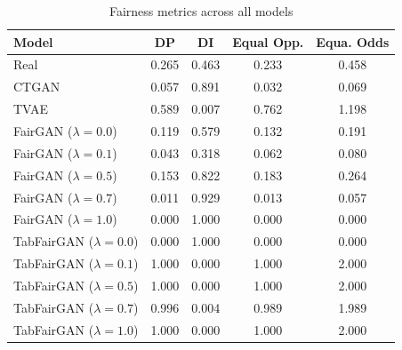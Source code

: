 \begin{table}[h!]
\label{tab:results-fairness}
\centering
\begin{tabular}{lcccc}
\toprule
Model & DP & DI & Equal Opp. & Equa. Odds \\
\midrule
Real & 0.265 & 0.463 & 0.233 & 0.458 \\
CTGAN & 0.057 & 0.891 & 0.032 & 0.069 \\
TVAE & 0.589 & 0.007 & 0.762 & 1.198 \\
FairGAN ($\lambda=0.0$) & 0.119 & 0.579 & 0.132 & 0.191 \\
FairGAN ($\lambda=0.1$) & 0.043 & 0.318 & 0.062 & 0.080 \\
FairGAN ($\lambda=0.5$) & 0.153 & 0.822 & 0.183 & 0.264 \\
FairGAN ($\lambda=0.7$) & 0.011 & 0.929 & 0.013 & 0.057 \\
FairGAN ($\lambda=1.0$) & 0.000 & 1.000 & 0.000 & 0.000 \\
TabFairGAN ($\lambda=0.0$) & 0.000 & 1.000 & 0.000 & 0.000 \\
TabFairGAN ($\lambda=0.1$) & 1.000 & 0.000 & 1.000 & 2.000 \\
TabFairGAN ($\lambda=0.5$) & 1.000 & 0.000 & 1.000 & 2.000 \\
TabFairGAN ($\lambda=0.7$) & 0.996 & 0.004 & 0.989 & 1.989 \\
TabFairGAN ($\lambda=1.0$) & 1.000 & 0.000 & 1.000 & 2.000 \\
\bottomrule
\end{tabular}
\caption{Fairness metrics across all models}
\end{table}
